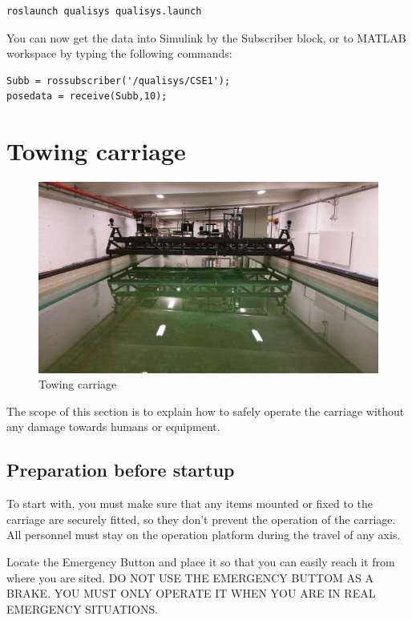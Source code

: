 \documentclass[a4paper,english]{report}
\begin{document}
\begin{verbatim}roslaunch qualisys qualisys.launch\end{verbatim}

You can now get the data into Simulink by the Subscriber block, or to MATLAB workspace by typing the following commands:

\begin{verbatim}Subb = rossubscriber('/qualisys/CSE1');
posedata = receive(Subb,10);\end{verbatim}

\clearpage

\section{Towing carriage}
\begin{figure}[htb!]
	\centering \includegraphics[width=1\textwidth]{fig/towing_carriage}
	\caption{Towing carriage}
	\label{fig: Towing carriage}
\end{figure}
The scope of this section is to explain how to safely operate the carriage without any damage towards humans or equipment. 

\subsection{Preparation before startup}
To start with, you must make sure that any items mounted or fixed to the carriage are securely fitted, so they don't prevent the operation of the carriage. All personnel must stay on the operation platform during the travel of any axis.

Locate the Emergency Button and place it so that you can easily reach it from where you are sited. DO NOT USE THE EMERGENCY BUTTOM AS A BRAKE. YOU MUST ONLY OPERATE IT WHEN YOU ARE IN REAL EMERGENCY SITUATIONS.
\end{document}
